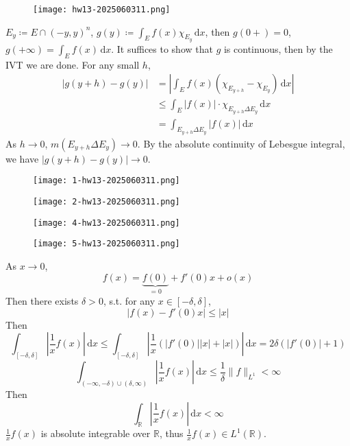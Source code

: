 \begin{exercise}
\begin{figure}[H]
\centering
\texttt{[image: hw13-2025060311.png]}
\label{}
\end{figure}
\end{exercise}
$E_{y}\coloneqq E\cap(-y,y)^{n}$, $g(y)\coloneqq \int_{E}^{} f(x)\chi_{E_{y}} \, \mathrm{d}x$, then $g(0+)=0$, $g(+\infty )=\int_{E}^{} f(x) \, \mathrm{d}x$. It suffices to show that $g$ is continuous, then by the IVT we are done. For any small $h$,
\[
\begin{aligned}
\lvert g(y+h)-g(y) \rvert  & =\left\lvert  \int_{E}^{} f(x)(\chi_{E_{y+h}}-\chi_{E_{y}}) \, \mathrm{d}x   \right\rvert  \\
 & \leq \int_{E}^{} \lvert f(x) \rvert \cdot \chi_{E_{y+h}\Delta E_{y}}   \, \mathrm{d}x  \\
 & =\int_{E_{y+h}\Delta E_{y} }^{}\lvert f(x) \rvert   \, \mathrm{d}x 
\end{aligned}
\]
As $h\to0$, $m(E_{y+h}\Delta E_{y})\to0$. By the absolute continuity of Lebesgue integral, we have $\lvert g(y+h)-g(y) \rvert\to0$.

\begin{remark}
\begin{figure}[H]
\centering
\texttt{[image: 1-hw13-2025060311.png]}
\label{}
\end{figure}
\begin{figure}[H]
\centering
\texttt{[image: 2-hw13-2025060311.png]}
\label{}
\end{figure}
\begin{figure}[H]
\centering
\texttt{[image: 4-hw13-2025060311.png]}
\label{}
\end{figure}
\end{remark}
\begin{exercise}
\begin{figure}[H]
\centering
\texttt{[image: 5-hw13-2025060311.png]}
\label{}
\end{figure}
\end{exercise}
As $x\to0$,
\[
f(x)=\underbrace{ f(0) }_{ =0 }+f'(0)x+o(x)
\]
Then there exists $\delta>0$, s.t. for any $x\in[-\delta,\delta]$,
\[
\lvert f(x)-f'(0)x \rvert \leq \lvert x \rvert
\]
Then
\[
\int_{[-\delta,\delta]}^{} \left\lvert  \frac{1}{x}f(x)  \right\rvert  \, \mathrm{d}x \leq \int_{[-\delta,\delta]}^{} \left\lvert  \frac{1}{x}(\lvert f'(0) \rvert \lvert x \rvert +\lvert x \rvert )  \right\rvert  \, \mathrm{d}x =2\delta(\lvert f'(0) \rvert +1)
\]
\[
\int_{(-\infty,-\delta)\cup(\delta,\infty)}^{} \left\lvert  \frac{1}{x}f(x)  \right\rvert  \, \mathrm{d}x \leq \frac{1}{\delta}\lVert f \rVert _{L^{1}}<\infty
\]
Then
\[
\int_{\mathbb{R}}^{} \left\lvert  \frac{1}{x}f(x)  \right\rvert  \, \mathrm{d}x <\infty
\]
$\frac{1}{x}f(x)$ is absolute integrable over $\mathbb{R}$, thus $\frac{1}{x}f (x)\in L^{1}(\mathbb{R})$.

